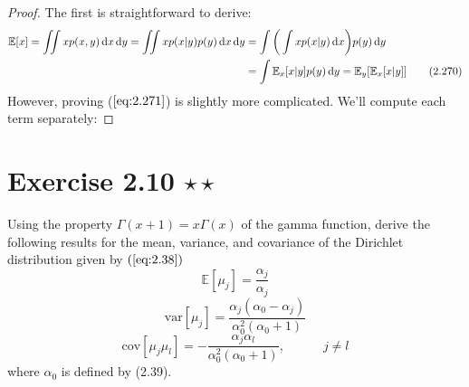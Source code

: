 \vspace{1em}

\begin{proof}
    The first is straightforward to derive:
    \begin{align*}
        \mathbb{E}[x] 
        = \iint x p(x, y) \mathop{}\!\mathrm{d} x \mathop{}\!\mathrm{d} y
        = \iint x p(x | y) p(y) \mathop{}\!\mathrm{d} x \mathop{}\!\mathrm{d} y
        &= \int\bigg(\int x p(x | y) \mathop{}\!\mathrm{d} x\bigg) p(y) \mathop{}\!\mathrm{d} y \\
        &= \int \mathbb{E}_x[x | y] p(y) \mathop{}\!\mathrm{d} y 
        = \mathbb{E}_y[\mathbb{E}_x[x | y]]
        \tag{2.270}
    \end{align*}
    However, proving ($\ref{eq:2.271}$) is slightly more complicated.
    We'll compute each term separately:
    
\end{proof}

\section*{Exercise 2.10 $\star \star$}
Using the property $\Gamma(x+1) = x\Gamma(x)$ of the gamma function,
derive the following results for the mean, variance, and covariance
of the Dirichlet distribution given by $(\ref{eq:2.38})$
\begin{equation*}
    \mathbb{E}[\mu_j] = \frac{\alpha_j}{\alpha_j}
    \tag{2.273}\label{eq:2.273}
\end{equation*}
\begin{equation*}
    \text{var}[\mu_j] = \frac{\alpha_j(\alpha_0 - \alpha_j)}{\alpha_0^2(\alpha_0 + 1)}
    \tag{2.274}\label{eq:2.274}
\end{equation*}
\begin{equation*}
    \text{cov}[\mu_j\mu_l] = -\frac{\alpha_j\alpha_l}{\alpha_0^2(\alpha_0 + 1)},
    \hspace{3em} j \neq l
    \tag{2.275}\label{eq:2.275}
\end{equation*}
where $\alpha_0$ is defined by  (2.39).

\vspace{1em}

